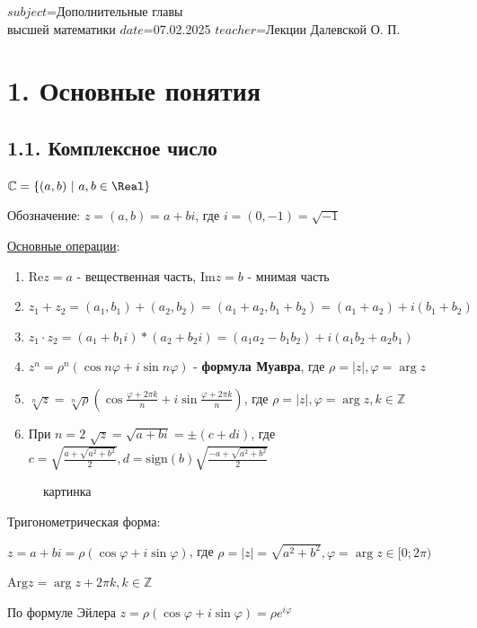 $subject$=Дополнительные главы \\ высшей математики
$date$=07.02.2025
$teacher$=Лекции Далевской О. П.

\section{1. Основные понятия}

\subsection{1.1. Комплексное число}

\Mem $\mathbb{C} = \{ (a, b) \ | \ a, b \in \Real\}$

Обозначение: $z = (a, b) = a + bi$, где $i = (0, -1) = \sqrt{-1}$

\underline{Основные операции}:

\begin{enumerate}
    \item $\mathrm{Re} z = a$ - вещественная часть, $\mathrm{Im} z = b$ - мнимая часть
    \item $z_1 + z_2 = (a_1, b_1) + (a_2, b_2) = (a_1 + a_2, b_1 + b_2) = (a_1 + a_2) + i(b_1 + b_2)$
    \item $z_1 \cdot z_2 = (a_1 + b_1 i) * (a_2 + b_2 i) = (a_1 a_2 - b_1 b_2) + i (a_1 b_2 + a_2 b_1)$
    \item $z^n = \rho^n (\cos n\varphi + i \sin n\varphi)$ - \textbf{формула Муавра}, где $\rho = |z|, \varphi = \arg z$
    \item $\sqrt[n]{z} = \sqrt[n]{\rho} \left(\cos \frac{\varphi + 2\pi k}{n} + i \sin \frac{\varphi + 2\pi k}{n}\right)$, где $\rho = |z|, \varphi = \arg z, k \in \mathbb{Z}$
    \item При $n = 2$ $\sqrt{z} = \sqrt{a + bi} = \pm (c + di)$, 
        где $c = \sqrt{\frac{a + \sqrt{a^2 + b^2}}{2}}, d = \mathrm{sign}(b) \sqrt{\frac{-a + \sqrt{a^2 + b^2}}{2}}$
\end{enumerate}

\begin{minipage}{\textwidth}
    \begin{figure}
        картинка
    \end{figure}

    Тригонометрическая форма:

    $z = a + bi = \rho (\cos \varphi + i \sin \varphi)$, где $\rho = |z| = \sqrt{a^2 + b^2}, \varphi = \arg z \in [0; 2\pi)$

    $\mathrm{Arg} z = \arg z + 2\pi k, k \in \mathbb{Z}$

    По формуле Эйлера $z = \rho (\cos \varphi + i \sin \varphi) = \rho e^{i \varphi}$
\end{minipage}

